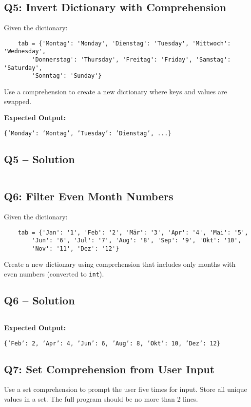 \documentclass[a4paper,11pt]{article}
\begin{document}
\subsection*{Q5: Invert Dictionary with Comprehension}
Given the dictionary:

\begin{verbatim}
	tab = {'Montag': 'Monday', 'Dienstag': 'Tuesday', 'Mittwoch': 'Wednesday',
		'Donnerstag': 'Thursday', 'Freitag': 'Friday', 'Samstag': 'Saturday',
		'Sonntag': 'Sunday'}
\end{verbatim}

Use a comprehension to create a new dictionary where keys and values are swapped.

\textbf{Expected Output:}
\begin{flushleft}
	\texttt{\{'Monday': 'Montag', 'Tuesday': 'Dienstag', ...\}}
\end{flushleft}

\subsection*{Q5 – Solution}
\inputminted{python}{Files/11/5.py}

\subsection*{Q6: Filter Even Month Numbers}
Given the dictionary:

\begin{verbatim}
	tab = {'Jan': '1', 'Feb': '2', 'Mär': '3', 'Apr': '4', 'Mai': '5',
		'Jun': '6', 'Jul': '7', 'Aug': '8', 'Sep': '9', 'Okt': '10',
		'Nov': '11', 'Dez': '12'}
\end{verbatim}

Create a new dictionary using comprehension that includes only months with even numbers (converted to \texttt{int}).

\subsection*{Q6 – Solution}
\inputminted{python}{Files/11/6.py}

\textbf{Expected Output:}
\begin{flushleft}
	\texttt{\{'Feb': 2, 'Apr': 4, 'Jun': 6, 'Aug': 8, 'Okt': 10, 'Dez': 12\}}
\end{flushleft}

\subsection*{Q7: Set Comprehension from User Input}
Use a set comprehension to prompt the user five times for input. Store all unique values in a set. The full program should be no more than 2 lines.
\end{document}
